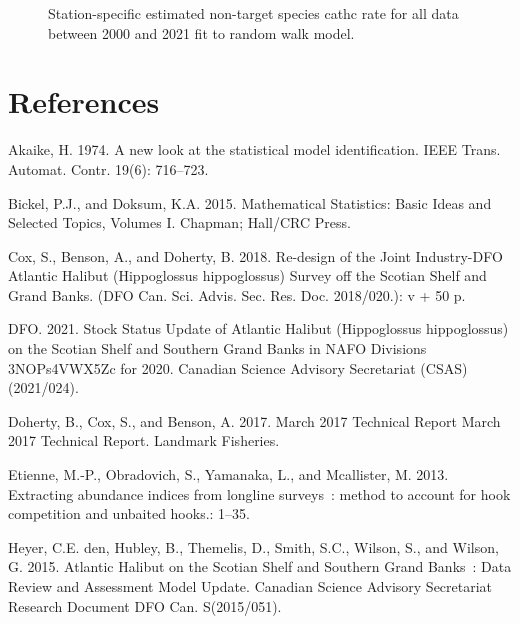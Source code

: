 \documentclass[12pt]{article}\usepackage[]{graphicx}\usepackage[]{color}
\begin{document}
\begin{appendices}
\begin{figure}[htb]
{}

\caption{Station-specific estimated non-target species cathc rate for all data between 2000 and 2021 fit to random walk model.}\label{fig:non-target-spat-fixed}
\end{figure}
\end{appendices}

\clearpage

\hypertarget{references}{%
\section{References}\label{references}}

\noindent \vspace{-2em} \setlength{\parindent}{-0.2in} \setlength{\leftskip}{0.2in} \setlength{\parskip}{8pt}

\hypertarget{refs}{}
\leavevmode\hypertarget{ref-Akaike1974}{}%
Akaike, H. 1974. A new look at the statistical model identification. IEEE Trans. Automat. Contr. 19(6): 716--723.

\leavevmode\hypertarget{ref-Bickel2015}{}%
Bickel, P.J., and Doksum, K.A. 2015. Mathematical Statistics: Basic Ideas and Selected Topics, Volumes I. Chapman; Hall/CRC Press.

\leavevmode\hypertarget{ref-Cox2018}{}%
Cox, S., Benson, A., and Doherty, B. 2018. Re-design of the Joint Industry-DFO Atlantic Halibut (Hippoglossus hippoglossus) Survey off the Scotian Shelf and Grand Banks. (DFO Can. Sci. Advis. Sec. Res. Doc. 2018/020.): v + 50 p.

\leavevmode\hypertarget{ref-DFO2021}{}%
DFO. 2021. Stock Status Update of Atlantic Halibut (Hippoglossus hippoglossus) on the Scotian Shelf and Southern Grand Banks in NAFO Divisions 3NOPs4VWX5Zc for 2020. Canadian Science Advisory Secretariat (CSAS) (2021/024).

\leavevmode\hypertarget{ref-Doherty2017}{}%
Doherty, B., Cox, S., and Benson, A. 2017. March 2017 Technical Report March 2017 Technical Report. Landmark Fisheries.

\leavevmode\hypertarget{ref-Etienne2013}{}%
Etienne, M.-P., Obradovich, S., Yamanaka, L., and Mcallister, M. 2013. Extracting abundance indices from longline surveys~: method to account for hook competition and unbaited hooks.: 1--35.

\leavevmode\hypertarget{ref-DenHeyer2015}{}%
Heyer, C.E. den, Hubley, B., Themelis, D., Smith, S.C., Wilson, S., and Wilson, G. 2015. Atlantic Halibut on the Scotian Shelf and Southern Grand Banks~: Data Review and Assessment Model Update. Canadian Science Advisory Secretariat Research Document DFO Can. S(2015/051).
\end{document}
